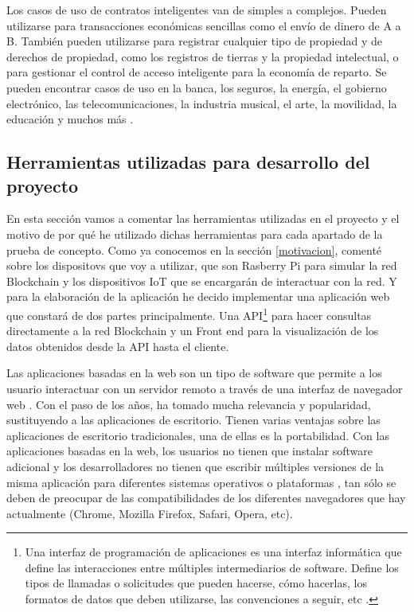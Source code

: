 Los casos de uso de contratos inteligentes van de simples a complejos. Pueden utilizarse para transacciones económicas 
sencillas como el envío de dinero de A a B. También pueden utilizarse para registrar cualquier tipo de propiedad y de 
derechos de propiedad, como los registros de tierras y la propiedad intelectual, o para gestionar el control de acceso 
inteligente para la economía de reparto. Se pueden encontrar casos de uso en la banca, los seguros, la energía, el 
gobierno electrónico, las telecomunicaciones, la industria musical, el arte, la movilidad, la educación y muchos más 
\cite{what-is-smart-contract}.

\subsection{Herramientas utilizadas para desarrollo del proyecto}

En esta sección vamos a comentar las herramientas utilizadas en el proyecto y el motivo de por qué he utilizado dichas
herramientas para cada apartado de la prueba de concepto. Como ya conocemos en la sección \ref{motivacion}, comenté 
sobre los dispositovs que voy a utilizar, que son Rasberry Pi para simular la red Blockchain y los dispositivos IoT que 
se encargarán de interactuar con la red. Y para la elaboración de la aplicación he decido implementar una aplicación 
web que constará de dos partes principalmente. Una API\footnote{Una interfaz de programación de aplicaciones es una 
interfaz informática que define las interacciones entre múltiples intermediarios de software. Define los tipos de 
llamadas o solicitudes que pueden hacerse, cómo hacerlas, los formatos de datos que deben utilizarse, las convenciones 
a seguir, etc \cite{api}.\label{fnlabel}} para hacer consultas directamente a la red Blockchain y un Front end para la 
visualización de los datos obtenidos desde la API hasta el cliente. 

\vspace{5mm}

\noindent Las aplicaciones basadas en la web son un tipo de software que permite a los usuario interactuar con un 
servidor remoto a través de una interfaz de navegador web \cite{web-based-app}. Con el paso de los años, ha tomado 
mucha relevancia y popularidad, sustituyendo a las aplicaciones de escritorio. Tienen varias ventajas sobre las 
aplicaciones de escritorio tradicionales, una de ellas es la portabilidad. Con las aplicaciones basadas en la web, 
los usuarios no tienen que instalar software adicional y los desarrolladores no tienen que escribir múltiples versiones 
de la misma aplicación para diferentes sistemas operativos o plataformas \cite{web-based-app}, tan sólo se deben de 
preocupar de las compatibilidades de los diferentes navegadores que hay actualmente (Chrome, Mozilla Firefox, Safari, 
Opera, etc).

